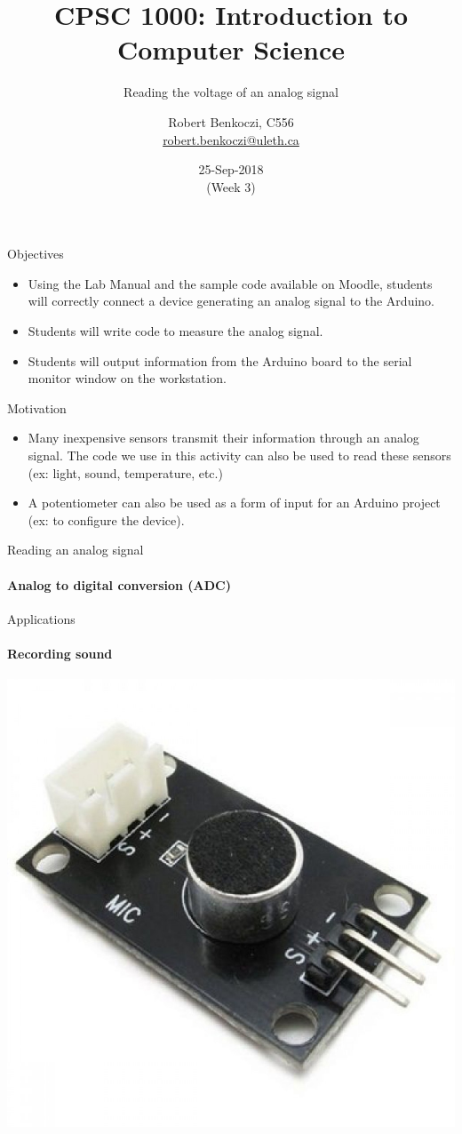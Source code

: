\documentclass[aspectratio=1610]{beamer}
\title %
{CPSC 1000: Introduction to Computer Science}
\subtitle{Reading the voltage of an analog signal} %
\author{Robert Benkoczi, C556\\\url{robert.benkoczi@uleth.ca}}
\date{25-Sep-2018\\(Week 3)}
\begin{document}
\begin{frame}[plain]
\titlepage
\end{frame}


\begin{frame}[t,plain]{Objectives}
\begin{itemize}
\item Using the Lab Manual and the sample code available on Moodle,
  students will correctly connect a device generating an analog signal
  to the Arduino.
\item Students will write code to measure the analog signal.
\item Students will output information from the Arduino board to the
  serial monitor window on the workstation.
\end{itemize}
\end{frame}



\begin{frame}[t,plain]{Motivation}
\begin{itemize}
\item Many inexpensive sensors transmit their information through an
  analog signal. The code we use in this activity can also be used to
  read these sensors (ex: light, sound, temperature, etc.)
\item A potentiometer can also be used as a form of input for an
  Arduino project (ex: to configure the device).
\end{itemize}
\end{frame}





\begin{frame}[t,plain]{Reading an analog signal}
\framesubtitle{Analog to digital conversion (ADC)}

\end{frame}



\begin{frame}[t,plain]{Applications}
\framesubtitle{Recording sound}

\includegraphics[width=.3\textwidth]{figs/3-sound-sensor.jpg}
\end{frame}
\end{document}
